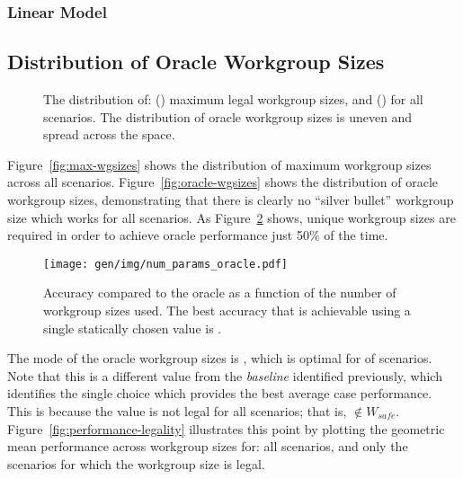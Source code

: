 \subsubsection{Linear Model}


\subsection{Distribution of Oracle Workgroup Sizes}

\begin{figure}

\caption{%
  The distribution of: () maximum legal
  workgroup sizes, and () for all
  scenarios. The distribution of oracle workgroup sizes is uneven and
  spread across the space.%
}
\label{fig:heatmaps}
\end{figure}

Figure~\ref{fig:max-wgsizes} shows the distribution of maximum
workgroup sizes across all scenarios. Figure~\ref{fig:oracle-wgsizes}
shows the distribution of oracle workgroup sizes, demonstrating that
there is clearly no ``silver bullet'' workgroup size which works for
all scenarios. As Figure~\ref{fig:oracle-accuracy} shows,
 unique workgroup sizes are
required in order to achieve oracle performance just 50\% of the
time. 

\begin{figure}
\centering
\texttt{[image: gen/img/num\_params\_oracle.pdf]}
\caption{%
  Accuracy compared to the oracle as a function of the number of
  workgroup sizes used. The best accuracy that is achievable using a
  single statically chosen value is
  \protect.%
}
\label{fig:oracle-accuracy}
\end{figure}

The mode of the oracle workgroup sizes is
, which is optimal for
 of scenarios. Note that this is
a different value from the \emph{baseline} identified previously,
which identifies the single choice which provides the best average
case performance. This is because the value is not legal for all
scenarios; that is, $ \not\in W_{safe}$.
Figure~\ref{fig:performance-legality} illustrates this point by
plotting the geometric mean performance across workgroup sizes for:
all scenarios, and only the scenarios for which the workgroup size is
legal.

